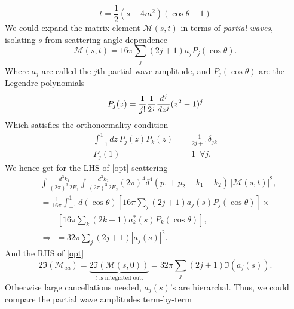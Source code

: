 \begin{equation}
	t = \frac{1}{2} (s-4 m^2)(\cos \theta-1)
\end{equation}
We could expand the matrix element $\mathcal M (s,t)$ in terms of \emph{partial waves}, isolating $s$ from scattering angle dependence
\begin{equation}
	\mathcal M (s,t) = 16 \pi \sum_j (2j+1)a_j P_j(\cos \theta).
\end{equation}
Where $a_j $ are called the $j$th partial wave amplitude, and  $P_j(\cos \theta)$ are the Legendre polynomials 
\begin{equation}
	P_j(z) = \frac{1}{j!}\frac{1}{2^j} {d^j\over dz^j} (z^2-1)^j
\end{equation}
Which satisfies the orthonormality condition
\begin{subequations}
	\begin{align}
		\int_{-1}^{1} dz \,P_j(z) P_k(z) &= \frac{1}{2j+1} \delta_{jk} \\
		P_j(1) &= 1 \,\,\, \forall j.
	\end{align}
\end{subequations}
We hence get for the LHS of \eqref{opt} scattering 
\begin{align}
	&\int  \frac{d^3k_1}{(2 \pi)^3\,2E_1} \int  \frac{d^3k_2}{(2 \pi)^3\,2E_2} (2 \pi)^4 \delta^4(p_1+p_2-k_1-k_2)\,| \mathcal M (s,t)|^2 ,\nonumber \\
	&= \frac{1}{16 \pi} \int_{-1}^{1} d(\cos \theta) \left[ 16 \pi \sum_j (2j+1) a_j(s) P_j(\cos \theta)\right] \times \nonumber\\ & \qquad \left[ 16 \pi \sum_k (2k+1) a_k^*(s) P_k(\cos \theta)\right], \nonumber \\
	&\Rightarrow \; = 32 \pi \sum_j (2j+1)| a_j(s)|^2.
\end{align}
And the RHS of \eqref{opt}
\begin{equation}
	2 \mathfrak{I}( \mathcal M_{aa}) = \underbrace{2 \mathfrak{I}( \mathcal M(s,0))}_{\text{$t$ is integrated out.}} = 32 \pi  \sum_j (2j+1) \mathfrak{I} (a_j(s)). 
\end{equation}
Otherwise large cancellations needed, $a_j(s)$'s are hierarchal. Thus, we could compare the partial wave amplitudes term-by-term 

